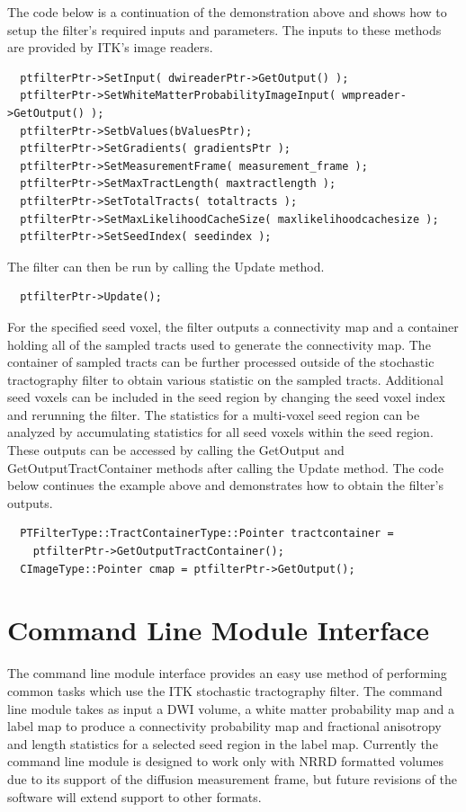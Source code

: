 The code below is a continuation of the demonstration above and shows how to setup the filter's required inputs and parameters.  The inputs to these methods are provided by ITK's image readers.
\begin{verbatim}
  ptfilterPtr->SetInput( dwireaderPtr->GetOutput() );
  ptfilterPtr->SetWhiteMatterProbabilityImageInput( wmpreader->GetOutput() );
  ptfilterPtr->SetbValues(bValuesPtr);
  ptfilterPtr->SetGradients( gradientsPtr );
  ptfilterPtr->SetMeasurementFrame( measurement_frame );
  ptfilterPtr->SetMaxTractLength( maxtractlength );
  ptfilterPtr->SetTotalTracts( totaltracts );
  ptfilterPtr->SetMaxLikelihoodCacheSize( maxlikelihoodcachesize );
  ptfilterPtr->SetSeedIndex( seedindex );
\end{verbatim}

The filter can then be run by calling the Update method.
\begin{verbatim}
  ptfilterPtr->Update();
\end{verbatim}

For the specified seed voxel, the filter outputs a connectivity map and a container holding all of the sampled tracts used to generate the connectivity map.  The container of sampled tracts can be further processed outside of the stochastic tractography filter to obtain various statistic on the sampled tracts.  Additional seed voxels can be included in the seed region by changing the seed voxel index and rerunning the filter.  The statistics for a multi-voxel seed region can be analyzed by accumulating statistics for all seed voxels within the seed region.  These outputs can be accessed by calling the GetOutput and GetOutputTractContainer methods after calling the Update method.  The code below continues the example above and demonstrates how to obtain the filter's outputs.
\begin{verbatim}
  PTFilterType::TractContainerType::Pointer tractcontainer = 
    ptfilterPtr->GetOutputTractContainer();
  CImageType::Pointer cmap = ptfilterPtr->GetOutput();
\end{verbatim}

\section{Command Line Module Interface}
The command line module interface provides an easy use method of performing common tasks which use the ITK stochastic tractography filter.  The command line module takes as input a DWI volume, a white matter probability map and a label map to produce a connectivity probability map and fractional anisotropy and length statistics for a selected seed region in the label map.  Currently the command line module is designed to work only with NRRD formatted volumes due to its support of the diffusion measurement frame, but future revisions of the software will extend support to other formats.

